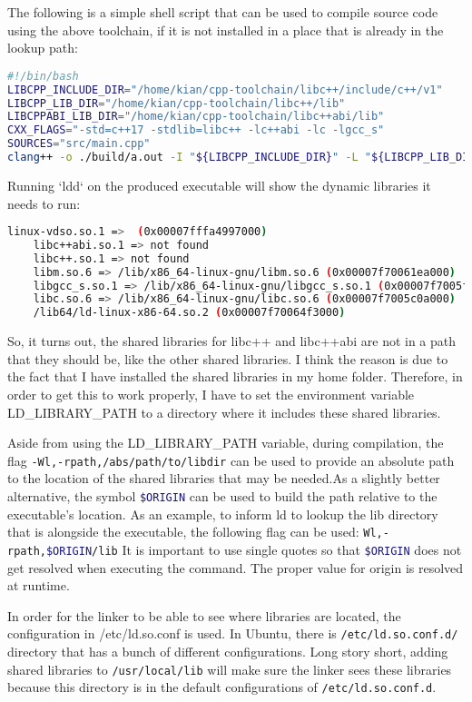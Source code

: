 The following is a simple shell script that can be used to compile source code using the above toolchain, if it is not installed in a place that is already in the lookup path:

\begin{lstlisting}[language=bash]
#!/bin/bash
LIBCPP_INCLUDE_DIR="/home/kian/cpp-toolchain/libc++/include/c++/v1"
LIBCPP_LIB_DIR="/home/kian/cpp-toolchain/libc++/lib"
LIBCPPABI_LIB_DIR="/home/kian/cpp-toolchain/libc++abi/lib"
CXX_FLAGS="-std=c++17 -stdlib=libc++ -lc++abi -lc -lgcc_s"
SOURCES="src/main.cpp"
clang++ -o ./build/a.out -I "${LIBCPP_INCLUDE_DIR}" -L "${LIBCPP_LIB_DIR}" -L "${LIBCPPABI_LIB_DIR}" ${CXX_FLAGS} ${SOURCES}
\end{lstlisting}

Running `ldd` on the produced executable will show the dynamic libraries it needs to run:

\begin{lstlisting}[language=bash]
    linux-vdso.so.1 =>  (0x00007fffa4997000)
    libc++abi.so.1 => not found
    libc++.so.1 => not found
    libm.so.6 => /lib/x86_64-linux-gnu/libm.so.6 (0x00007f70061ea000)
    libgcc_s.so.1 => /lib/x86_64-linux-gnu/libgcc_s.so.1 (0x00007f7005fd4000)
    libc.so.6 => /lib/x86_64-linux-gnu/libc.so.6 (0x00007f7005c0a000)
    /lib64/ld-linux-x86-64.so.2 (0x00007f70064f3000)
\end{lstlisting}

So, it turns out, the shared libraries for libc++ and libc++abi are not in a path that they should be, like the other shared libraries. I think the reason is due to the fact that I have installed the shared libraries in my home folder. Therefore, in order to get this to work properly, I have to set the environment variable LD_LIBRARY_PATH to a directory where it includes these shared libraries.

Aside from using the LD_LIBRARY_PATH variable, during compilation, the flag \lstinline[language=bash]|-Wl,-rpath,/abs/path/to/libdir| can be used to provide an absolute path to the location of the shared libraries that may be needed.As a slightly better alternative, the symbol \lstinline[language=bash]|$ORIGIN| can be used to build the path relative to the executable's location. As an example, to inform ld to lookup the lib directory that is alongside the executable, the following flag can be used: \lstinline[language=bash]|Wl,-rpath,$ORIGIN/lib|
It is important to use single quotes so that \lstinline[language=bash]|$ORIGIN| does not get resolved when executing the command. The proper value for origin is resolved at runtime.

In order for the linker to be able to see where libraries are located, the configuration in /etc/ld.so.conf is used. In Ubuntu, there is \lstinline[language=bash]|/etc/ld.so.conf.d/| directory that has a bunch of different configurations. Long story short, adding shared libraries to \lstinline[language=bash]|/usr/local/lib| will make sure the linker sees these libraries because this directory is in the default configurations of \lstinline[language=bash]|/etc/ld.so.conf.d|.

